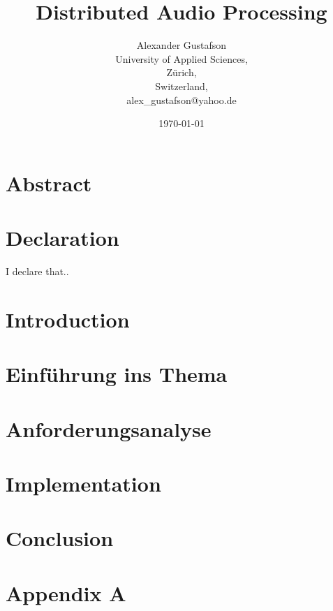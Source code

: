 \documentclass{report}
\begin{document}
\title{Distributed Audio Processing}
\author{Alexander Gustafson\\
  University of Applied Sciences,\\
  Zürich,\\
  Switzerland,\\
  alex\_gustafson@yahoo.de}
\date{\today}
\maketitle

\chapter*{Abstract}


\chapter*{Declaration}
I declare that..

\tableofcontents

\chapter{Introduction}



\chapter{Einführung ins Thema}






\chapter{Anforderungsanalyse}







\chapter{Implementation}


\chapter{Conclusion}


{}


\chapter{Appendix A}


\end{document}
